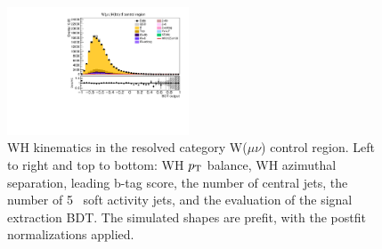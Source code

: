 \begin{figure}[tbp]
\begin{center}
    \includegraphics[width=0.48\textwidth]{figures/wlnhbb2016/resolved/WmnWH2TopCR_bdtValue.pdf}
    \caption{WH kinematics in the resolved category W($\mu\nu$) \ttbar control region.
    Left to right and top to bottom: WH $p_{\mathrm{T}}$ balance, WH azimuthal separation, leading b-tag score, the number of central jets,
    the number of 5 \GeV\ soft activity jets, and the evaluation of the signal extraction BDT.
    The simulated shapes are prefit, with the postfit normalizations applied.}
    \label{fig:res_WmnTT_WH}
  \end{center}
\end{figure}
\clearpage

